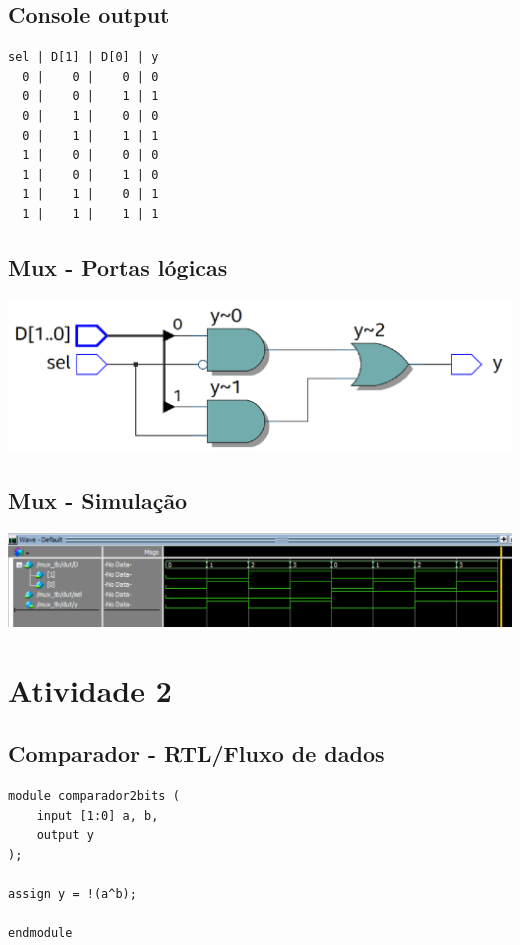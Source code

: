 \documentclass{article}
\begin{document}
\newpage
\subsection{Console output}
\begin{verbatim}
sel | D[1] | D[0] | y
  0 |    0 |    0 | 0
  0 |    0 |    1 | 1
  0 |    1 |    0 | 0
  0 |    1 |    1 | 1
  1 |    0 |    0 | 0
  1 |    0 |    1 | 0
  1 |    1 |    0 | 1
  1 |    1 |    1 | 1
\end{verbatim}

\subsection{Mux - Portas lógicas}
\includegraphics[width=1.0\textwidth]{mux_rtl.png}

\subsection{Mux - Simulação}
\includegraphics[width=1.0\textwidth]{mux_wave.png}

\newpage

\section*{Atividade 2}
\setcounter{section}{2}
\setcounter{subsection}{0}

\subsection{Comparador - RTL/Fluxo de dados}
\begin{verbatim}
module comparador2bits (
    input [1:0] a, b,
    output y
);

assign y = !(a^b);

endmodule
\end{verbatim}
\end{document}
